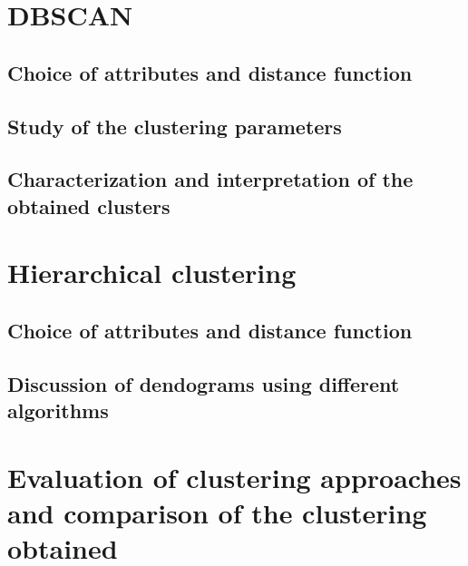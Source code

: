 \section{DBSCAN}
\subsection{Choice of attributes and distance function}
\subsection{Study of the clustering parameters}
\subsection{Characterization and interpretation of the obtained clusters}
\section{Hierarchical clustering}
\subsection{Choice of attributes and distance function}
\subsection{Discussion of dendograms using different algorithms}

\section{Evaluation of clustering approaches and comparison of the clustering obtained}
